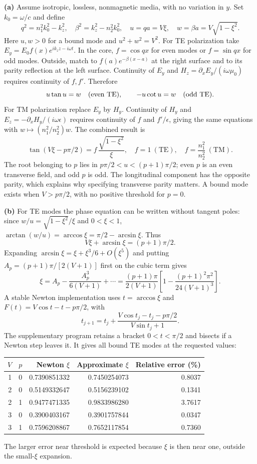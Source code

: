 \medskip\noindent\textbf{(a)} Assume isotropic, lossless, nonmagnetic media, with no variation in $y$.
Set $k_0=\omega/c$ and define
\[
q^2=n_1^2k_0^2-k_z^2,\quad
\beta^2=k_z^2-n_2^2k_0^2,\quad
u=qa=V\xi,\quad w=\beta a=V\sqrt{1-\xi^2}.
\]
Here $u,w>0$ for a bound mode and $u^2+w^2=V^2$.
For TE polarization take $E_y=E_0f(x)e^{ik_zz-i\omega t}$.
In the core, $f=\cos qx$ for even modes or $f=\sin qx$ for odd
modes.  Outside, match to $f(a)e^{-\beta(x-a)}$ at the right
surface and to its parity reflection at the left surface.
Continuity of $E_y$ and $H_z=\partial_xE_y/(i\omega\mu_0)$
requires continuity of $f,f'$.  Therefore
\[
u\tan u=w\quad(\hbox{even TE}),\qquad
-u\cot u=w\quad(\hbox{odd TE}).
\]
For TM polarization replace $E_y$ by $H_y$.  Continuity of $H_y$
and $E_z=-\partial_xH_y/(i\omega\epsilon)$ requires continuity
of $f$ and $f'/\epsilon$, giving the same equations with
$w\mapsto(n_1^2/n_2^2)w$.  The combined result is
\[
\boxed{\tan(V\xi-p\pi/2)=f\,\frac{\sqrt{1-\xi^2}}{\xi},
\quad f=1\ (\mathrm{TE}),\quad f=\frac{n_1^2}{n_2^2}\ (\mathrm{TM}).}
\]
The root belonging to $p$ lies in
$p\pi/2<u<(p+1)\pi/2$; even $p$ is an even transverse field,
and odd $p$ is odd.  The longitudinal component has the opposite
parity, which explains why specifying transverse parity matters.
A bound mode exists when $V>p\pi/2$, with no positive threshold
for $p=0$.

\medskip\noindent\textbf{(b)} For TE modes the phase equation can be written without tangent poles:
since $w/u=\sqrt{1-\xi^2}/\xi$ and $0<\xi<1$,
$\arctan(w/u)=\arccos\xi=\pi/2-\arcsin\xi$. Thus
\[
V\xi+\arcsin\xi=(p+1)\pi/2.
\]
Expanding $\arcsin\xi=\xi+\xi^3/6+O(\xi^5)$ and putting
$A_p=(p+1)\pi/[2(V+1)]$ first on the cubic term gives
\[
\xi=A_p-\frac{A_p^3}{6(V+1)}+\cdots
=\boxed{\frac{(p+1)\pi}{2(V+1)}
 \left[1-\frac{(p+1)^2\pi^2}{24(V+1)^3}\right].}
\]
A stable Newton implementation uses $t=\arccos\xi$ and
$F(t)=V\cos t-t-p\pi/2$, with
\[
t_{j+1}=t_j+\frac{V\cos t_j-t_j-p\pi/2}{V\sin t_j+1}.
\]
The supplementary program retains a bracket $0<t<\pi/2$ and
bisects if a Newton step leaves it.  It gives all bound TE modes
at the requested values:
\begin{center}
\begin{tabular}{rrrrr}
\toprule
$V$&$p$&Newton $\xi$&Approximate $\xi$&Relative error (\%)\\
\midrule
1&0&0.7390851332&0.7450254073&0.8037\\
2&0&0.5149332647&0.5156239102&0.1341\\
2&1&0.9477471335&0.9833986280&3.7617\\
3&0&0.3900403167&0.3901757844&0.0347\\
3&1&0.7596208867&0.7652117854&0.7360\\
\bottomrule
\end{tabular}
\end{center}
The larger error near threshold is expected because $\xi$ is then
near one, outside the small-$\xi$ expansion.

